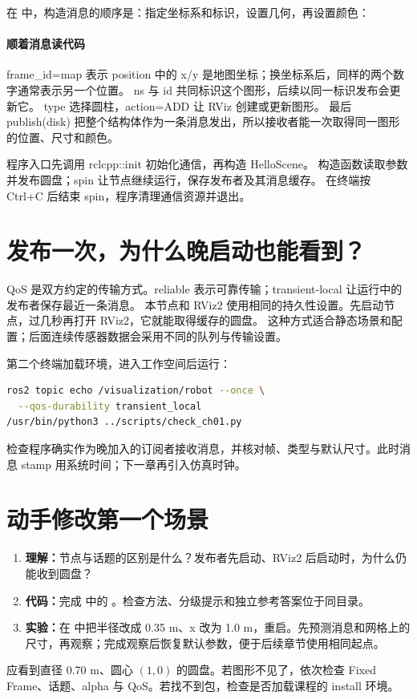在  中，构造消息的顺序是：指定坐标系和标识，设置几何，再设置颜色：
\par\noindent\begin{minipage}{\linewidth}

\end{minipage}\par

\paragraph{顺着消息读代码}
frame\_id=map 表示 position 中的 x/y 是地图坐标；换坐标系后，同样的两个数字通常表示另一个位置。
ns 与 id 共同标识这个图形，后续以同一标识发布会更新它。
type 选择圆柱，action=ADD 让 RViz 创建或更新图形。
最后 publish(disk) 把整个结构体作为一条消息发出，所以接收者能一次取得同一图形的位置、尺寸和颜色。

程序入口先调用 rclcpp::init 初始化通信，再构造 HelloScene。
构造函数读取参数并发布圆盘；spin 让节点继续运行，保存发布者及其消息缓存。
在终端按 Ctrl+C 后结束 spin，程序清理通信资源并退出。

\section{发布一次，为什么晚启动也能看到？}
QoS 是双方约定的传输方式。reliable 表示可靠传输；transient-local 让运行中的发布者保存最近一条消息。
本节点和 RViz2 使用相同的持久性设置。先启动节点，过几秒再打开 RViz2，它就能取得缓存的圆盘。
这种方式适合静态场景和配置；后面连续传感器数据会采用不同的队列与传输设置。

第二个终端加载环境，进入工作空间后运行：
\begin{lstlisting}[language=bash,numbers=none]
ros2 topic echo /visualization/robot --once \
  --qos-durability transient_local
/usr/bin/python3 ../scripts/check_ch01.py
\end{lstlisting}
检查程序确实作为晚加入的订阅者接收消息，并核对帧、类型与默认尺寸。此时消息 stamp 用系统时间；下一章再引入仿真时钟。

\section{动手修改第一个场景}
\begin{enumerate}
\item \textbf{理解：}节点与话题的区别是什么？发布者先启动、RViz2 后启动时，为什么仍能收到圆盘？
\item \textbf{代码：}完成  中的
\code{EXERCISE(ch01-1)}。检查方法、分级提示和独立参考答案位于同目录。
\item \textbf{实验：}在  中把半径改成 0.35 m、x 改为 1.0 m，重启。先预测消息和网格上的尺寸，再观察；完成观察后恢复默认参数，便于后续章节使用相同起点。
\end{enumerate}
应看到直径 0.70 m、圆心 $(1,0)$ 的圆盘。若图形不见了，依次检查 Fixed Frame、话题、alpha 与 QoS。若找不到包，检查是否加载课程的 install 环境。

